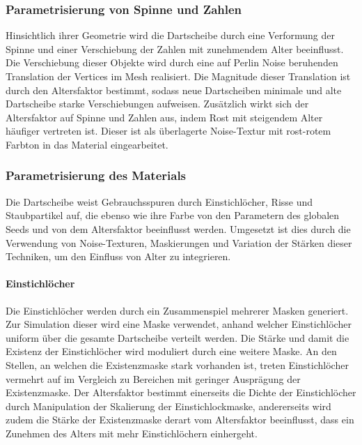 \subsubsection{Parametrisierung von Spinne und Zahlen}

Hinsichtlich ihrer Geometrie wird die Dartscheibe durch eine Verformung der Spinne und einer Verschiebung der Zahlen mit zunehmendem Alter beeinflusst. Die Verschiebung dieser Objekte wird durch eine auf Perlin Noise beruhenden Translation der Vertices im Mesh realisiert. Die Magnitude dieser Translation ist durch den Altersfaktor bestimmt, sodass neue Dartscheiben minimale und alte Dartscheibe starke Verschiebungen aufweisen. Zusätzlich wirkt sich der Altersfaktor auf Spinne und Zahlen aus, indem Rost mit steigendem Alter häufiger vertreten ist. Dieser ist als überlagerte Noise-Textur mit rost-rotem Farbton in das Material eingearbeitet.

\newpage
\subsubsection{Parametrisierung des Materials}

Die Dartscheibe weist Gebrauchsspuren durch Einstichlöcher, Risse und Staubpartikel auf, die ebenso wie ihre Farbe von den Parametern des globalen Seeds und von dem Altersfaktor beeinflusst werden. Umgesetzt ist dies durch die Verwendung von Noise-Texturen, Maskierungen und Variation der Stärken dieser Techniken, um den Einfluss von Alter zu integrieren.

\paragraph{Einstichlöcher}

Die Einstichlöcher werden durch ein Zusammenspiel mehrerer Masken generiert. Zur Simulation dieser wird eine Maske verwendet, anhand welcher Einstichlöcher uniform über die gesamte Dartscheibe verteilt werden. Die Stärke und damit die Existenz der Einstichlöcher wird moduliert durch eine weitere Maske. An den Stellen, an welchen die Existenzmaske stark vorhanden ist, treten Einstichlöcher vermehrt auf im Vergleich zu Bereichen mit geringer Ausprägung der Existenzmaske. Der Altersfaktor bestimmt einerseits die Dichte der Einstichlöcher durch Manipulation der Skalierung der Einstichlockmaske, andererseits wird zudem die Stärke der Existenzmaske derart vom Altersfaktor beeinflusst, dass ein Zunehmen des Alters mit mehr Einstichlöchern einhergeht.


